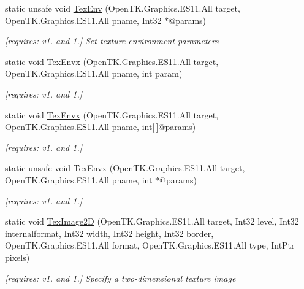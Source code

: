 \begin{DoxyCompactItemize}
static unsafe void \hyperlink{class_open_t_k_1_1_graphics_1_1_e_s11_1_1_g_l_ae25efefd7868e58a1bf0429444d5d5c1}{Tex\-Env} (Open\-T\-K.\-Graphics.\-E\-S11.\-All target, Open\-T\-K.\-Graphics.\-E\-S11.\-All pname, Int32 $\ast$@params)
\begin{DoxyCompactList}\small\item\em \mbox{[}requires\-: v1. and 1.\mbox{]} Set texture environment parameters \end{DoxyCompactList}\item 
static void \hyperlink{class_open_t_k_1_1_graphics_1_1_e_s11_1_1_g_l_adb37d1db5d0aa03cdb202e99abc6b012}{Tex\-Envx} (Open\-T\-K.\-Graphics.\-E\-S11.\-All target, Open\-T\-K.\-Graphics.\-E\-S11.\-All pname, int param)
\begin{DoxyCompactList}\small\item\em \mbox{[}requires\-: v1. and 1.\mbox{]}\end{DoxyCompactList}\item 
static void \hyperlink{class_open_t_k_1_1_graphics_1_1_e_s11_1_1_g_l_a1c4954eed70845e1805b0c9a9bac23be}{Tex\-Envx} (Open\-T\-K.\-Graphics.\-E\-S11.\-All target, Open\-T\-K.\-Graphics.\-E\-S11.\-All pname, int\mbox{[}$\,$\mbox{]}@params)
\begin{DoxyCompactList}\small\item\em \mbox{[}requires\-: v1. and 1.\mbox{]}\end{DoxyCompactList}\item 
static unsafe void \hyperlink{class_open_t_k_1_1_graphics_1_1_e_s11_1_1_g_l_a119eff3b31e27181ad191d2622f8e45a}{Tex\-Envx} (Open\-T\-K.\-Graphics.\-E\-S11.\-All target, Open\-T\-K.\-Graphics.\-E\-S11.\-All pname, int $\ast$@params)
\begin{DoxyCompactList}\small\item\em \mbox{[}requires\-: v1. and 1.\mbox{]}\end{DoxyCompactList}\item 
static void \hyperlink{class_open_t_k_1_1_graphics_1_1_e_s11_1_1_g_l_a87ef4297d1f57a6b85f1a43627d7abb5}{Tex\-Image2\-D} (Open\-T\-K.\-Graphics.\-E\-S11.\-All target, Int32 level, Int32 internalformat, Int32 width, Int32 height, Int32 border, Open\-T\-K.\-Graphics.\-E\-S11.\-All format, Open\-T\-K.\-Graphics.\-E\-S11.\-All type, Int\-Ptr pixels)
\begin{DoxyCompactList}\small\item\em \mbox{[}requires\-: v1. and 1.\mbox{]} Specify a two-\/dimensional texture image \end{DoxyCompactList}\item 

\end{DoxyCompactItemize}

